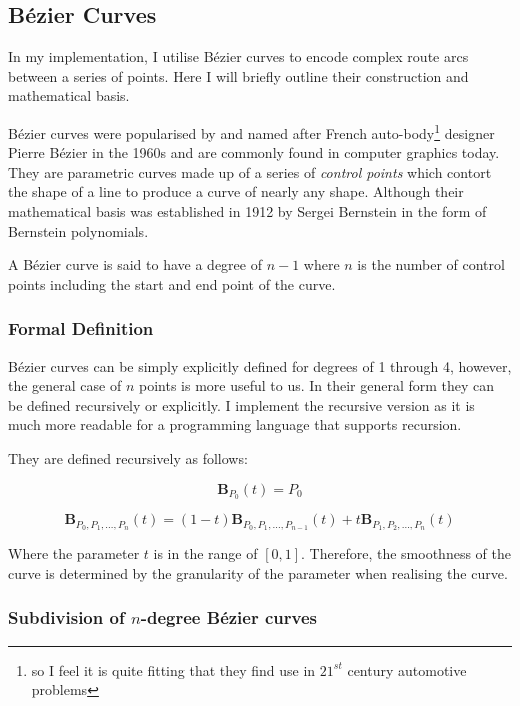 \subsection{Bézier Curves}
\label{sec:back-bezier-curves}

In my implementation, I utilise Bézier curves to encode complex route arcs between a series of points. Here I will briefly outline their construction and mathematical basis.

Bézier curves were popularised by and named after French auto-body\footnote{so I feel it is quite fitting that they find use in $21^{st}$ century automotive problems} designer Pierre Bézier in the 1960s and are commonly found in computer graphics today. They are parametric curves made up of a series of \textit{control points} which contort the shape of a line to produce a curve of nearly any shape. Although their mathematical basis was established in 1912 by Sergei Bernstein in the form of Bernstein polynomials\cite{bernstein1912best}.

A Bézier curve is said to have a degree of $n-1$ where $n$ is the number of control points including the start and end point of the curve.

\subsubsection{Formal Definition} 

Bézier curves can be simply explicitly defined for degrees of 1 through 4, however, the general case of $n$ points is more useful to us. In their general form they can be defined recursively or explicitly. I implement the recursive version as it is much more readable for a programming language that supports recursion.

They are defined recursively as follows:

\begin{equation}
    \textbf{B}_{P_0}(t) = P_0
\end{equation}

\begin{equation}
    \textbf{B}_{P_0,P_1,\ldots,P_n}(t) = (1-t)\textbf{B}_{P_0,P_1,\ldots,P_{n-1}}(t) + t\textbf{B}_{P_1,P_2,\ldots,P_n}(t)
\end{equation}

Where the parameter $t$ is in the range of $[0,1]$. Therefore, the smoothness of the curve is determined by the granularity of the parameter when realising the curve.

\subsubsection{Subdivision of $n$-degree Bézier curves}

